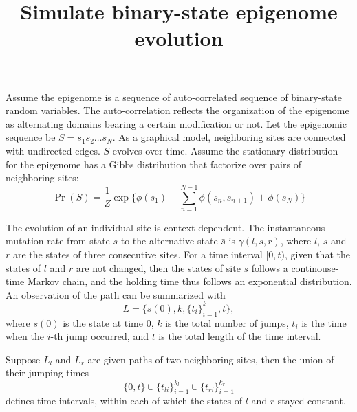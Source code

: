 \documentclass[11pt]{article}
\title{Simulate binary-state epigenome evolution}
\begin{document}
\maketitle

Assume the epigenome is a sequence of auto-correlated sequence of
binary-state random variables. The auto-correlation reflects the
organization of the epigenome as alternating domains bearing a certain
modification or not. Let the epigenomic sequence be $S=s_1s_2\ldots
s_N$. As a graphical model, neighboring sites are connected with
undirected edges. $S$ evolves over time. Assume the stationary
distribution for the epigenome has a Gibbs distribution that factorize
over pairs of neighboring sites:
\begin{equation}\label{eqn:stationary}
\Pr(S) = \frac{1}{Z} \exp\big\{\phi(s_1) +\sum_{n=1}^{N-1}\phi(s_n, s_{n+1}) + \phi(s_N)\big\}
\end{equation}

The evolution of an individual site is context-dependent. The
instantaneous mutation rate from state $s$ to the alternative
state $\bar{s}$ is $\gamma(l, s, r)$, where $l$, $s$ and $r$
are the states of three consecutive sites.  For a time interval $[0,t)$,
given that the states of $l$ and $r$ are not changed, then
the states of site $s$ follows a continouse-time Markov chain, 
and the holding time thus follows an exponential distribution.
An observation of the path can be summarized with
\[
  L = \big\{s(0), k, \{t_i\}_{i=1}^{k}, t \big\},
\]
where $s(0)$ is the state at time 0, $k$ is the total number of jumps,
$t_i$ is the time when the $i$-th jump occurred, and $t$ is the total
length of the time interval.

Suppose $L_l$ and $L_r$ are given paths of two neighboring sites, then
the union of their jumping times
\[
  \{0, t\} \cup \{t_{li}\}_{i=1}^{k_l} \cup \{t_{ri}\}_{i=1}^{k_r} 
\] defines time intervals, within each of which
the states of $l$ and $r$ stayed constant.
\end{document}
